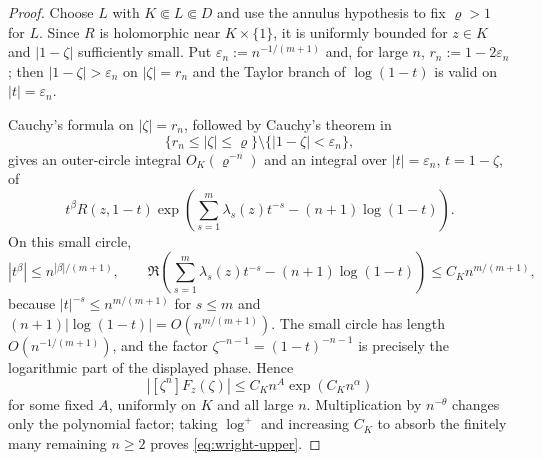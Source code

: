 \documentclass[reqno]{article}
\theoremstyle{definition}
\theoremstyle{remark}
\theoremstyle{plain}
\begin{document}
\begin{proof}
Choose $L$ with $K\Subset L\Subset D$ and use the annulus hypothesis to fix $\varrho>1$ for $L$. Since $R$ is holomorphic near $K\times\{1\}$, it is uniformly bounded for $z\in K$ and $|1-\zeta|$ sufficiently small. Put $\varepsilon_n:=n^{-1/(m+1)}$ and, for large $n$, $r_n:=1-2\varepsilon_n$; then $|1-\zeta|>\varepsilon_n$ on $|\zeta|=r_n$ and the Taylor branch of $\log(1-t)$ is valid on $|t|=\varepsilon_n$.

Cauchy's formula on $|\zeta|=r_n$, followed by Cauchy's theorem in
$$\{r_n\le |\zeta|\le\varrho\}\setminus\{|1-\zeta|<\varepsilon_n\},$$
gives an outer-circle integral $O_K(\varrho^{-n})$ and an integral over $|t|=\varepsilon_n$, $t=1-\zeta$, of
$$t^\beta R(z,1-t)\exp\!\left(\sum_{s=1}^m\lambda_s(z)t^{-s}-(n+1)\log(1-t)\right).$$
On this small circle,
$$|t^\beta|\le n^{|\beta|/(m+1)},\qquad
\Re\left(\sum_{s=1}^m\lambda_s(z)t^{-s}-(n+1)\log(1-t)\right)
\le C_K n^{m/(m+1)},$$
because $|t|^{-s}\le n^{m/(m+1)}$ for $s\le m$ and $(n+1)|\log(1-t)|=O(n^{m/(m+1)})$. The small circle has length $O(n^{-1/(m+1)})$, and the factor $\zeta^{-n-1}=(1-t)^{-n-1}$ is precisely the logarithmic part of the displayed phase. Hence
$$|[\zeta^n]F_z(\zeta)|\le C_K n^{A}\exp(C_K n^\alpha)$$
for some fixed $A$, uniformly on $K$ and all large $n$. Multiplication by $n^{-\theta}$ changes only the polynomial factor; taking $\log^+$ and increasing $C_K$ to absorb the finitely many remaining $n\ge2$ proves \eqref{eq:wright-upper}.
\end{proof}
\end{document}
